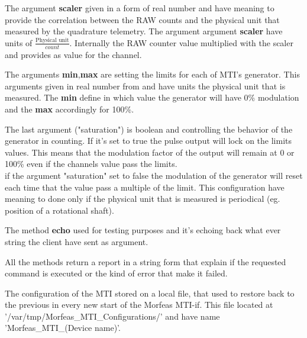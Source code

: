 The argument \textbf{scaler} given in a form of real number and have meaning to provide the correlation between the RAW counts and the physical unit that measured by the quadrature telemetry.
The argument argument \textbf{scaler} have units of $\displaystyle\frac{\text{Physical unit}}{count}$. Internally the RAW counter value multiplied with the scaler and provides as value for the channel.

The arguments \textbf{min},\textbf{max} are setting the limits for each of MTI's generator. This arguments given in real number from and have units the physical unit that is measured.
The \textbf{min} define in which value the generator will have 0\% modulation and the \textbf{max} accordingly for 100\%.

The last argument ("saturation") is boolean and controlling the behavior of the generator in counting. If it's set to true the pulse output will lock on the limits values.
This means that the modulation factor of the output will remain at 0 or 100\% even if the channels value pass the limits.\\
if the argument "saturation" set to false the modulation of the generator will reset each time that the value pass a multiple of the limit. This configuration have meaning to done
only if the physical unit that is measured is periodical (eg. position of a rotational shaft).

The method \textbf{echo} used for testing purposes and it's echoing back what ever string the client have sent as argument.

All the methods return a report in a string form that explain if the requested command is executed or the kind of error that make it failed.

The configuration of the MTI stored on a local file, that used to restore back to the previous in every new start of the Morfeas MTI-if.
This file located at '/var/tmp/Morfeas\_MTI\_Configurations/' and have name 'Morfeas\_MTI\_(Device name)'.
